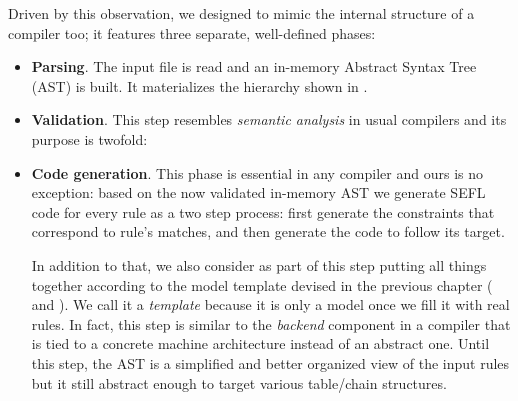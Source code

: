 Driven by this observation, we designed \TOOL to mimic the internal
structure of a compiler too; it features three separate, well-defined phases:
\begin{itemize}
  \item \textbf{Parsing}. The input file is read and an in-memory Abstract
    Syntax Tree (AST) is built.  It
    materializes the hierarchy shown in
    .
  \item \textbf{Validation}.  This step resembles \emph{semantic analysis} in
    usual compilers and its purpose is twofold:
  \item \textbf{Code generation}. This phase is essential in any compiler and
    ours is no exception: based on the now validated in-memory AST we generate
    SEFL code for every rule as a two step process: first generate the
    constraints that correspond to rule's matches, and then
    generate the code to follow its target.

    In addition to that, we also consider as part of this step putting all
    things together according to the model template devised in the previous
    chapter ( and
    ).  We call it a \emph{template}
    because it is only a model once we fill it with real rules.  In fact, this
    step is similar to the \emph{backend} component in a compiler that is tied
    to a concrete machine architecture instead of an abstract one.  Until this
    step, the AST is a simplified and better organized view of the input rules
    but it still abstract enough to target various table/chain structures.
\end{itemize}

